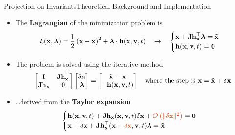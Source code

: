 \begin{frame}{Projection on Invariants}{Theoretical Background and Implementation}
  \begin{itemize}
    \item The \textbf{Lagrangian} of the minimization problem is
    \begin{equation*}
      \mathcal{L}(\mathbf{x}, \boldsymbol{\lambda}) = \frac{1}{2}\left(\mathbf{x} - \tilde{\mathbf{x}}\right)^2 + \boldsymbol{\lambda} \cdot \mathbf{h}(\mathbf{x}, \mathbf{v}, t)
      \quad \rightarrow \quad
      \begin{cases}
        \mathbf{x} + \mathbf{Jh}_{\mathbf{x}}^\top \boldsymbol{\lambda} = \tilde{\mathbf{x}} \\
        \mathbf{h}(\mathbf{x}, \mathbf{v}, t) = \mathbf{0}
      \end{cases}
    \end{equation*}
    \item The problem is solved using the iterative method
    \begin{equation*}
      \begin{bmatrix}
        \mathbf{I}        & \mathbf{Jh}_{\mathbf{x}}^\top \\
        \mathbf{Jh}_{\mathbf{x}} & \mathbf{0}
      \end{bmatrix}
      \begin{bmatrix}
        \delta\mathbf{x} \\
        \boldsymbol{\lambda}
      \end{bmatrix} = \begin{bmatrix}
        \tilde{\mathbf{x}} - \mathbf{x} \\
        -\mathbf{h}(\mathbf{x}, \mathbf{v}, t)
      \end{bmatrix} \quad \text{where the step is $\mathbf{x} = \tilde{\mathbf{x}} + \delta\mathbf{x}$}
    \end{equation*}
    \item[] \dots derived from the \textbf{Taylor expansion}
    \begin{equation*}
      \begin{cases}
        \mhv + \m{Jh}_{\mx}(\mx, \m{v}, t) \delta\mx + \textcolor{mycolor2}{\mathcal{O}\left(\| \delta\mx \|^2\right)} = \m{0} \\
        \mx + \delta\mx + \m{Jh}_{\mx}^{\top}(\mx + \textcolor{mycolor2}{\delta \mx}, \m{v}, t) \boldsymbol{\lambda} = \tilde{\mx}
      \end{cases}
    \end{equation*}
  \end{itemize}
\end{frame}

